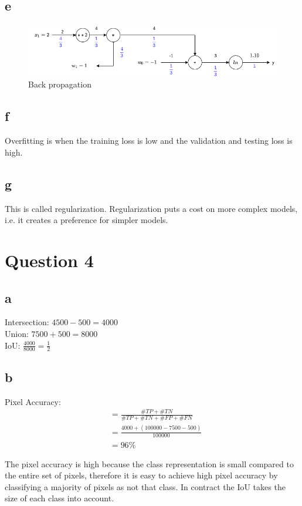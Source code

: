 \documentclass[12pt]{article}
\begin{document}
\subsection{e}
\begin{figure}[H]
    \centering
    \includegraphics[width=0.6\linewidth]{3e.png}
    \caption{Back propagation}
\end{figure}

\subsection{f}
Overfitting is when the training loss is low and the validation and testing loss is high.

\subsection{g}
This is called regularization. Regularization puts a cost on more complex models, i.e. it creates a preference for simpler models.

\section{Question 4}
\subsection{a}
Intersection: $4500-500=4000$\\
Union: $7500+500=8000$\\
IoU: $\frac{4000}{8000}=\frac{1}{2}$

\subsection{b}
Pixel Accuracy:
\begin{align*}
     & = \frac{\#TP + \#TN}{\#TP + \#TN + \#FP + \#FN} \\
     & = \frac{4000+(100000-7500-500)}{100000}         \\
     & = 96\%
\end{align*}

The pixel accuracy is high because the class representation is small compared to the entire set of pixels, therefore it is easy to achieve high pixel accuracy by classifying a majority of pixels as not that class.
In contract the IoU takes the size of each class into account.
\end{document}
